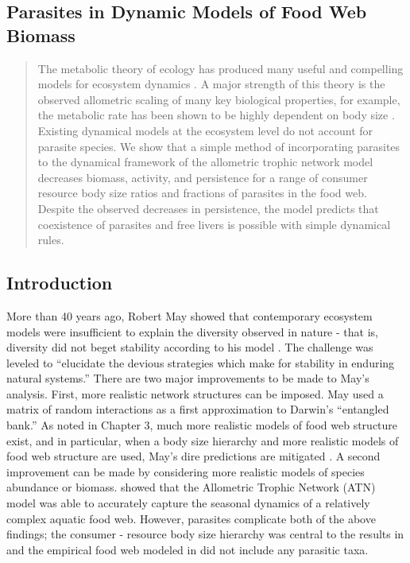 \documentclass[/home/nkappler/Research/Dissertation/dissertation.tex]{subfiles}
\begin{document}
\begin{bibunit}
\chapter{Parasites in Dynamic Models of Food Web Biomass}

\begin{abstract}

The metabolic theory of ecology has produced many useful and compelling models
for ecosystem dynamics \cite{Yodzis1992, Williams2007, Molnar2012, Boit2012}. A
major strength of this theory is the observed allometric scaling of many key
biological properties, for example, the metabolic rate has been shown to be
highly dependent on body size \cite{Brown2004}. Existing dynamical models at
the ecosystem level do not account for parasite species. We show that a simple
method of incorporating parasites to the dynamical framework of the allometric
trophic network model decreases biomass, activity, and persistence for a range
of consumer resource body size ratios and fractions of parasites in the food
web. Despite the observed decreases in persistence, the model predicts that
coexistence of parasites and free livers is possible with simple dynamical
rules.

\end{abstract}

\newpage

\section{Introduction}

More than 40 years ago, Robert May showed that contemporary ecosystem models
were insufficient to explain the diversity observed in nature - that is,
diversity did not beget stability according to his model \cite{May1972}. The
challenge was leveled to ``elucidate the devious strategies which make for
stability in enduring natural systems.'' There are two major improvements to be
made to May's analysis. First, more realistic network structures can be
imposed. May used a matrix of random interactions as a first approximation to
Darwin's ``entangled bank.'' As noted in Chapter 3, much more realistic models
of food web structure exist, and in particular, when a body size hierarchy and
more realistic models of food web structure are used, May's dire predictions
are mitigated \cite{Allesina2012}. A second improvement can be made by
considering more realistic models of species abundance or biomass.
\cite{Boit2012} showed that the Allometric Trophic Network (ATN) model was able
to accurately capture the seasonal dynamics of a relatively complex aquatic
food web. However, parasites complicate both of the above findings; the
consumer - resource body size hierarchy was central to the results in
\cite{Allesina2012} and the empirical food web modeled in \cite{Boit2012} did
not include any parasitic taxa. 
 

\end{bibunit}
\end{document}
